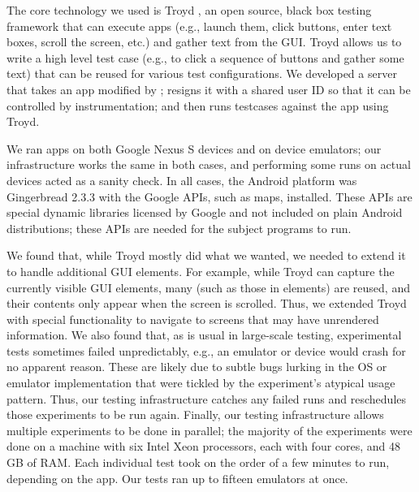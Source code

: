 The core technology we used is Troyd \cite{jsjeon:troyd}, an open
source, black box testing framework that can execute apps (e.g.,
launch them, click buttons, enter text boxes, scroll the screen, etc.)
and gather text from the GUI.  Troyd allows us to write a high level
test case (e.g., to click a sequence of buttons and gather some text)
that can be reused for various test configurations.  We developed a
server that takes an app modified by \fuzzer{}; resigns it with a
shared user ID so that it can be controlled by instrumentation; and
then runs testcases against the app using Troyd.

We ran apps on both Google Nexus S devices and on device emulators;
our infrastructure works the same in both cases, and performing some
runs on actual devices acted as a sanity check. In all cases, the
Android platform was Gingerbread 2.3.3 with the Google APIs, such as
maps, installed. These APIs are special dynamic libraries licensed by
Google and not included on plain Android distributions; these APIs are
needed for the subject programs to run.

We found that, while Troyd mostly did what we wanted, we needed to
extend it to handle additional GUI elements.
For example, while Troyd can capture the currently visible GUI elements,
many  (such as those in  elements) are 
reused, and their contents only appear when the screen is scrolled.
Thus, we extended Troyd with special functionality to 
navigate to screens that may have unrendered information.
We also found that, as is usual in large-scale
testing, 
experimental tests sometimes failed unpredictably, e.g., an emulator
or device would crash for no apparent reason. These are likely due to
subtle bugs lurking in the OS or emulator implementation that
were tickled by the experiment's atypical usage pattern. Thus, our
testing infrastructure catches any failed runs and reschedules those
experiments to be run again. Finally, our testing infrastructure allows
multiple experiments to be done in parallel; the majority of the
experiments were done on a machine with six Intel Xeon processors, 
each with four cores, and 48 GB of RAM.  Each individual test took on
the order of a few minutes to run, depending on the app.
Our tests ran up to fifteen emulators at once.

